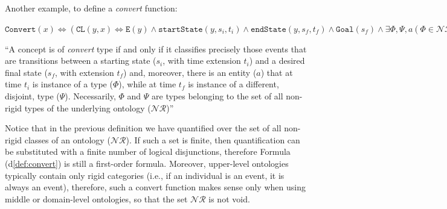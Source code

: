 \documentclass[sw]{iosart2x}
\newcommand{\bflist}{\begin{list}{}{\setlength{\topsep}{2mm}\setlength{\partopsep}{0mm}\setlength{\parsep}{0mm}\setlength{\leftmargin}{9mm}\setlength{\labelwidth}{8mm}}}
\newcommand{\eflist}{\end{list}}
\newcommand{\DefLabel}{\textrm{d}}
\newcounter{cntdef}
\newcommand{\mydf}[1]{\refstepcounter{cntdef}\begin{small}{\bf \DefLabel\thecntdef\label{def:#1}}\end{small}}
\newcommand{\mytext}[1]{``#1''}
\newcommand{\refdf}[1]{({\DefLabel}\ref{#1})}
\newcommand{\generalStyle}[1]{\texttt{#1}}
\newcommand{\biRel}[3]{\generalStyle{#1}(#2,#3)}
\newcommand{\uniRel}[2]{\generalStyle{#1}(#2)}
\newcommand{\triRel}[4]{\generalStyle{#1}(#2,#3,#4)}
\newcommand{\myiff}{\Longleftrightarrow}
\newcommand{\DOLCEEvent}[1]{\uniRel{{E}}{#1}}
\newcommand{\DOLCEPC}[3]{\triRel{{PC}}{#1}{#2}{#3}}
\newcommand{\DOLCECLbyBinary}[2]{\biRel{CL}{#1}{#2}}
\newcommand{\Goal}[1]{\uniRel{Goal}{#1}}
\newcommand{\Convert}[1]{\uniRel{Convert}{#1}}
\newcommand{\sState}[3]{\triRel{startState}{#1}{#2}{#3}}
\newcommand{\eState}[3]{\triRel{endState}{#1}{#2}{#3}}
\begin{document}
Another example, to define a \textit{convert} function: 
\bflist
  \item[\mydf{convert}] $ \Convert{x} \myiff (\DOLCECLbyBinary{y}{x} \myiff \DOLCEEvent{y} \land \sState{y}{s_i}{t_i} \land \eState{y}{s_f}{t_f} \land \Goal{s_f} \land \exists \Phi,\Psi,a (\Phi\in\mathcal{NR} \land \Psi\in\mathcal{NR} \land \Psi\cap\Phi = \emptyset \land  \DOLCEPC{a}{s_i}{t_i} \land \DOLCEPC{a}{s_f}{t_f} \land \Phi(a,t_i) \land \Psi(a,t_f))) $ 
  \item[] \mytext{A concept is of \textit{convert} type if and only if it classifies precisely those events that are transitions between a starting state ($s_i$, with time extension $t_i$) and a desired final state ($s_f$, with extension $t_f$) and, moreover, there is an entity ($a$) that at time $t_i$ is instance of a type ($\Phi$), while at time $t_f$ is instance of a different, disjoint, type ($\Psi$). Necessarily, $\Phi$ and $\Psi$ are types belonging to the set of all non-rigid types of the underlying ontology ($\mathcal{NR}$)}
\eflist 
Notice that in the previous definition we have quantified over the set of all non-rigid classes of an ontology ($\mathcal{NR}$). 
If such a set is finite, then quantification can be substituted with a finite number of logical disjunctions, therefore Formula \refdf{def:convert} is still a first-order formula.
Moreover, upper-level ontologies typically contain only rigid categories (i.e., if an individual is an event, it is always an event), therefore, such a convert function makes sense only when using middle or domain-level ontologies, so that the set $\mathcal{NR}$ is not void.     
\end{document}
